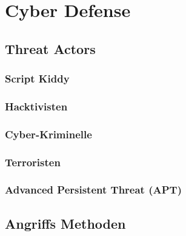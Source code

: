 

\section{Cyber Defense}

\subsection{Threat Actors}

\subsubsection{Script Kiddy}

\subsubsection{Hacktivisten}

\subsubsection{Cyber-Kriminelle}

\subsubsection{Terroristen}

\subsubsection{Advanced Persistent Threat (APT)}

\subsection{Angriffs Methoden}

